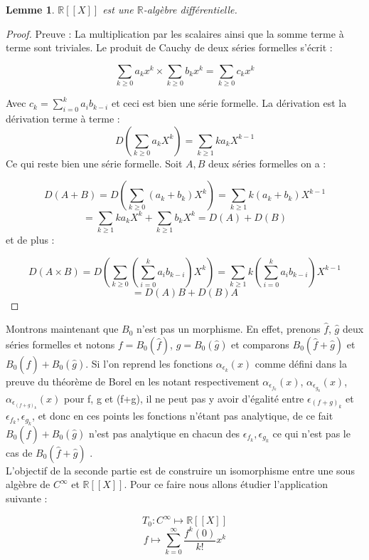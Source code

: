 \documentclass[12pt,a4paper]{amsart}
\newtheorem{lem}[thm]{\bf Lemme}
\begin{document}
\begin{lem}
 $\mathbb{R}[[X]]$ est une $\mathbb{R}$-algèbre différentielle. 
\end{lem}
\begin{proof}
Preuve : La multiplication par les scalaires ainsi que la somme terme à terme sont triviales. Le produit de Cauchy de deux séries formelles s'écrit : 

$$\sum_{k\geq 0} a_{k} x^{k} \times \sum_{k\geq 0} b_{k}x^{k}= \sum_{k\geq 0} c_{k}x^{k}$$

Avec $c_{k}= \sum_{i=0}^{k}a_{i}b_{k-i}$ et ceci est bien une série formelle.
La dérivation est la dérivation terme à terme : 
$$D\left(\sum_{k\geq 0} a_{k}X^{k}\right)= \sum_{k\geq 1} k a_{k}X^{k-1}$$
Ce qui reste bien une série formelle. Soit $A,B$ deux séries formelles on a : 

$$D(A+B) = D\left(\sum_{k\geq 0} (a_{k}+b_{k}) X^{k}\right)=\sum_{k\geq 1} k(a_{k}+b_{k}) X^{k-1}$$
$$=\sum_{k\geq 1} ka_{k} X^{k} +\sum_{k\geq 1} b_{k} X^{k}=D(A)+D(B)$$
et de plus : 

$$D(A\times B) = D\left(\sum_{k\geq 0} \left(\sum_{i=0}^{k}a_{i}b_{k-i} \right) X^{k}\right)= \sum_{k\geq 1} k \left(\sum_{i=0}^{k} a_{i}b_{k-i}\right) X^{k-1}$$
$$= D(A)B+D(B)A$$
\end{proof}
Montrons maintenant que $B_{0}$ n'est pas un morphisme. En effet, prenons $\hat{f}$, $\hat{g}$ deux séries formelles et notons $f=B_{0}(\hat{f})$, $g=B_{0}(\hat{g})$ et comparons $B_{0}(\hat{f} + \hat{g})$ et $ B_{0}(\hat{f}) + B_{0}(\hat{g})$. Si l'on reprend les fonctions $\alpha_{\epsilon_{k}}(x)$ comme défini dans la preuve du théorème de Borel en les notant respectivement $\alpha_{\epsilon_{f_{k}}}(x)$, $\alpha_{\epsilon_{g_{k}}}(x)$, $\alpha_{\epsilon_{(f+g)_{k}}}(x)$  pour f, g et (f+g), il ne peut pas y avoir d'égalité entre $\epsilon_{(f+g)_{k}}$ et $\epsilon_{f_{k}} , \epsilon_{g_{k}}$, et donc en ces points les fonctions n'étant pas analytique,  de ce fait $ B_{0}(\hat{f}) + B_{0}(\hat{g})$ n'est pas analytique en chacun des $\epsilon_{f_{k}} , \epsilon_{g_{k}}$ ce qui n'est pas le cas de $B_{0}(\hat{f} + \hat{g})$ . \\

L'objectif de la seconde partie est de construire un isomorphisme entre une sous algèbre de $C^{\infty}$ et $\mathbb{R}[[X]]$. Pour ce faire nous allons étudier l'application suivante : 

$$T_{0} : C^{\infty} \mapsto \mathbb{R}[[X]]$$
$$f \longmapsto \sum_{k=0}^{\infty} \dfrac{f^{k}(0)}{k!}x^{k}$$
\end{document}
